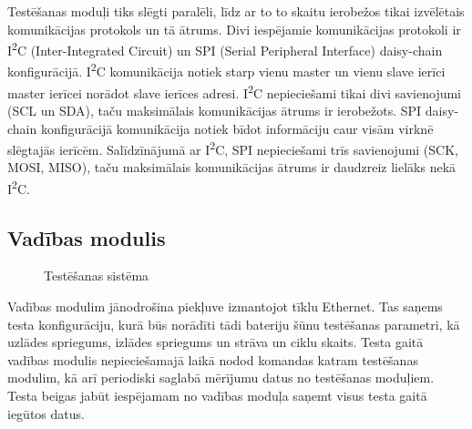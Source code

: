 \documentclass[12pt,fleqn,titlepage,oneside]{article}
\numberwithin{equation}{section}
\numberwithin{figure}{section}
\numberwithin{table}{section}
\begin{document}
Testēšanas moduļi tiks slēgti paralēli, līdz ar to to skaitu ierobežos tikai izvēlētais komunikācijas protokols un tā ātrums.
Divi iespējamie komunikācijas protokoli ir I\textsuperscript{2}C (Inter-Integrated Circuit) un SPI (Serial Peripheral Interface) daisy-chain konfigurācijā.
I\textsuperscript{2}C komunikācija notiek starp vienu master un vienu slave ierīci master ierīcei norādot slave ierīces adresi.
I\textsuperscript{2}C nepieciešami tikai divi savienojumi (SCL un SDA), taču maksimālais komunikācijas ātrums ir ierobežots.
SPI daisy-chain konfigurācijā komunikācija notiek bīdot informāciju caur visām virknē slēgtajās ierīcēm. Salīdzīnājumā ar I\textsuperscript{2}C, SPI nepieciešami trīs savienojumi (SCK, MOSI, MISO), taču maksimālais komunikācijas ātrums ir daudzreiz lielāks nekā I\textsuperscript{2}C.

\subsection{Vadības modulis}

\begin{figure}[h]
	\centering
	\caption{Testēšanas sistēma}
\end{figure}

Vadības modulim jānodrošina piekļuve izmantojot tīklu Ethernet.
Tas saņems testa konfigurāciju, kurā būs norādīti tādi bateriju šūnu testēšanas parametri, kā uzlādes spriegums, izlādes spriegums un strāva un ciklu skaits.
Testa gaitā vadības modulis nepieciešamajā laikā nodod komandas katram testēšanas modulim, kā arī periodiski saglabā mērījumu datus no testēšanas moduļiem.
Testa beigas jabūt iespējamam no vadības moduļa saņemt visus testa gaitā iegūtos datus.
\end{document}
